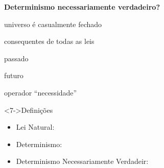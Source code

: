 \begin{frame}{\textbf{Determinismo necessariamente verdadeiro?}}
	\begin{description}
	 \item<2->[$u$:] universo é casualmente fechado
		\item<3->[$p$:] consequentes de todas as leis
		\item<4->[$\ell$:] passado
		\item<5->[$f$:] futuro
		\item<6->[$\square$:] operador ``necessidade''
	\end{description}
	\centering
	\begin{minipage}{\textwidth}
  \begin{exampleblock}<7->{Definições}
	  \begin{itemize}
		  \item<8-> \textcolor{NordYellow}{Lei Natural}: \only<9->{$u\rightarrow p$}
			 \item<10-> \textcolor{NordYellow}{Determinismo}: \only<11->{$[(u\rightarrow p) \wedge \ell]\rightarrow f$}
			 \item<12-> \textcolor{NordYellow}{Determinismo Necessariamente Verdadeir}: \only<13->{$\square\left\{\,[(u\rightarrow p) \wedge \ell]\rightarrow f\,\right\}$}
		 \end{itemize}
	 \end{exampleblock}
	\end{minipage}
\end{frame}

